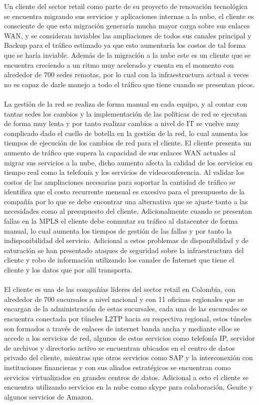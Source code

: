 Un cliente del sector retail como parte de su proyecto de renovación tecnológica se encuentra migrando sus servicios y aplicaciones internas a la nube, el cliente es consciente de que esta migración generaría mucha mayor carga sobre sus enlaces WAN, y se consideran inviables las ampliaciones de todos sus canales principal y Backup para el tráfico estimado ya que esto aumentaría los costos de tal forma que se haría inviable. Además de la migración a la nube este es un cliente que se encuentra creciendo a un ritmo muy acelerado y cuenta en el momento con alrededor de 700 sedes remotas, por lo cual con la infraestructura actual a veces no es capaz de darle manejo a todo el tráfico que tiene cuando se presentan picos.
\\
\\
La gestión de la red se realiza de forma manual en cada equipo, y al contar con tantas sedes los cambios y la implementación de las políticas de red se ejecutan de forma muy lenta y por tanto realizar cambios a nivel de IT se vuelve muy complicado dado el cuello de botella en la gestión de la red, lo cual aumenta los tiempos de ejecución de los cambios de red para el cliente.
El cliente presenta un aumento de tráfico que supera la capacidad de sus enlaces WAN actuales al migrar sus servicios a la nube, dicho aumento afecta la calidad de los servicios en tiempo real como la telefonía y los servicios de videoconferencia. Al validar los costos de las ampliaciones necesarias para soportar la cantidad de tráfico se identifica que el costo recurrente mensual es excesivo para el presupuesto de la compañía por lo que se debe encontrar una alternativa que se ajuste tanto a las necesidades como al presupuesto del cliente. Adicionalmente cuando se presentan fallas en la MPLS el cliente debe conmutar su tráfico al datacenter de forma manual, lo cual aumenta los tiempos de gestión de las fallas y por tanto la indisponibilidad del servicio. Adicional a estos problemas de disponibilidad y de saturación se han presentado ataques de seguridad sobre la infraestructura del cliente y robo de información utilizando los canales de Internet que tiene el cliente y los datos que por allí transporta.
\\
\\
El cliente es una de las compañías líderes del sector retail en Colombia, con alrededor de 700 sucursales a nivel nacional y con 11 oficinas regionales que se encargan de la administración de estas sucursales,	cada una de las sucursales se encuentra  conectada por túneles L2TP hacia su respectiva regional, estos túneles son formados a través de enlaces de internet banda ancha y mediante ellos se accede a los servicios de red, algunos de estos servicios como telefonía IP, servidor de archivos y directorio activo se encuentran ubicados en el centro de datos privado del cliente, mientras que otros servicios como SAP y la interconexión con instituciones financieras y con sus aliados estratégicos se encuentran como servicios virtualizados en grandes centros de datos. Adicional a esto el cliente se encuentra utilizando servicios en la nube como skype para colaboración, Gsuite y algunos servicios de Amazon.
